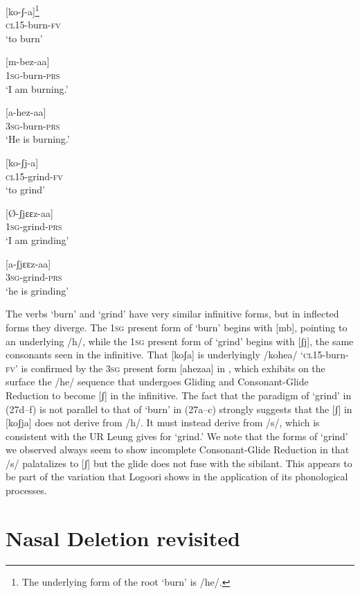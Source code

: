 \documentclass[output=paper]{langsci/langscibook}
\begin{document}
\ea\label{ex:glewwe:27}{}
  \ea\label{ex:glewwe:27a}
 [ko-ʃ{}-a]\footnote{The underlying form of the root ‘burn’ is /he/.} \\{}
\textsc{cl15}-burn-\textsc{fv}\\{}
\glt ‘to burn’

\ex\label{ex:glewwe:27b}{}
 [m-bez-aa]\\{}
\textsc{1sg}-burn-\textsc{prs}\\{}
\glt ‘I am burning.’


\ex\label{ex:glewwe:27c}{}
 [a-hez-aa]\\{}
\textsc{3sg}-burn-\textsc{prs}\\{}
\glt ‘He is burning.’


\ex\label{ex:glewwe:27d}{}
 [ko-ʃj-a]\\{}
\textsc{cl15}-grind-\textsc{fv}\\{}
\glt ‘to grind’


\ex\label{ex:glewwe:27e}{}
 [Ø-ʃjɛɛz-aa]\\{}
\textsc{1sg}-grind-\textsc{prs}\\{}
\glt ‘I am grinding’


\ex\label{ex:glewwe:27f}{}
 [a-ʃjɛɛz-aa]\\{}
\textsc{3sg}-grind-\textsc{prs}\\{}
\glt ‘he is grinding’
\z
\z

The verbs ‘burn’ and ‘grind’ have very similar infinitive forms, but in inflected forms they diverge. The 1\textsc{sg} present form of ‘burn’ begins with [mb], pointing to an underlying /h/, while the 1\textsc{sg} present form of ‘grind’ begins with [ʃj], the same consonants seen in the infinitive. That [koʃa] is underlyingly /kohea/ ‘\textsc{cl}15-burn-\textsc{fv’} is confirmed by the 3\textsc{sg} present form [ahezaa] in , which exhibits on the surface the /he/ sequence that undergoes Gliding and Consonant-Glide Reduction to become [ʃ] in the infinitive. The fact that the paradigm of ‘grind’ in (27d–f) is not parallel to that of ‘burn’ in (27a–c) strongly suggests that the [ʃ] in [koʃja] does not derive from /h/. It must instead derive from /s/, which is consistent with the UR Leung gives for ‘grind.’ We note that the forms of ‘grind’ we observed always seem to show incomplete Consonant-Glide Reduction in that /s/ palatalizes to [ʃ] but the glide does not fuse with the sibilant. This appears to be part of the variation that Logoori shows in the application of its phonological processes.

\section{Nasal Deletion revisited}\label{sec:glewwe:5}
\end{document}
